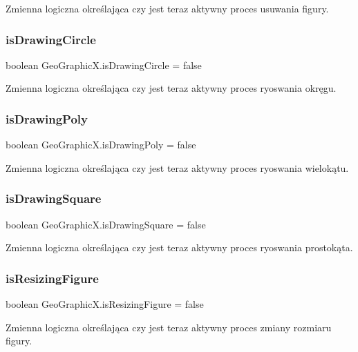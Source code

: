 Zmienna logiczna określająca czy jest teraz aktywny proces usuwania figury. \mbox{\label{class_geo_graphic_x_ade4a70db318177597dd2ab2bd7982d19}} 
\subsubsection{is\+Drawing\+Circle}
{\footnotesize\ttfamily boolean Geo\+Graphic\+X.\+is\+Drawing\+Circle = false}

Zmienna logiczna określająca czy jest teraz aktywny proces ryoswania okręgu. \mbox{\label{class_geo_graphic_x_ac5d66e793eed874bcfc1883499c255f1}} 
\subsubsection{is\+Drawing\+Poly}
{\footnotesize\ttfamily boolean Geo\+Graphic\+X.\+is\+Drawing\+Poly = false}

Zmienna logiczna określająca czy jest teraz aktywny proces ryoswania wielokątu. \mbox{\label{class_geo_graphic_x_ad3bc7f2c5b0c5db882e21c5c433604ee}} 
\subsubsection{is\+Drawing\+Square}
{\footnotesize\ttfamily boolean Geo\+Graphic\+X.\+is\+Drawing\+Square = false}

Zmienna logiczna określająca czy jest teraz aktywny proces ryoswania prostokąta. \mbox{\label{class_geo_graphic_x_a0814229dbc30bdd2a5aca2b50bd258df}} 
\subsubsection{is\+Resizing\+Figure}
{\footnotesize\ttfamily boolean Geo\+Graphic\+X.\+is\+Resizing\+Figure = false}

Zmienna logiczna określająca czy jest teraz aktywny proces zmiany rozmiaru figury. \mbox{\label{class_geo_graphic_x_a199634684b043e71e078341b1c8c8989}} 
